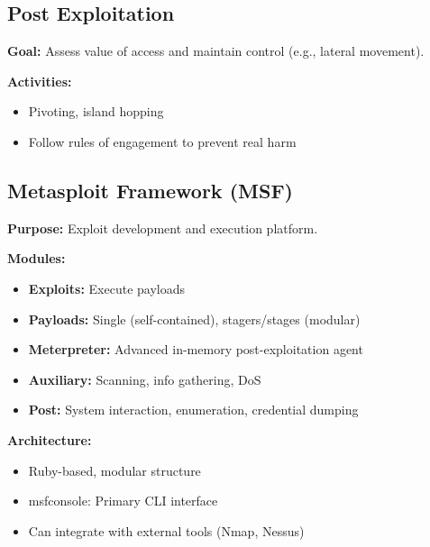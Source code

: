 \subsection{Post Exploitation}{
\textbf{Goal:} Assess value of access and maintain control (e.g., lateral movement).

\textbf{Activities:}
\begin{itemize}[noitemsep]
  \item Pivoting, island hopping
  \item Follow rules of engagement to prevent real harm
\end{itemize}
}
\subsection{Metasploit Framework (MSF)}{
\textbf{Purpose:} Exploit development and execution platform.

\textbf{Modules:}
\begin{itemize}[noitemsep]
  \item \textbf{Exploits:} Execute payloads
  \item \textbf{Payloads:} Single (self-contained), stagers/stages (modular)
  \item \textbf{Meterpreter:} Advanced in-memory post-exploitation agent
  \item \textbf{Auxiliary:} Scanning, info gathering, DoS
  \item \textbf{Post:} System interaction, enumeration, credential dumping
\end{itemize}

\textbf{Architecture:}
\begin{itemize}[noitemsep]
  \item Ruby-based, modular structure
  \item msfconsole: Primary CLI interface
  \item Can integrate with external tools (Nmap, Nessus)
\end{itemize}
}
